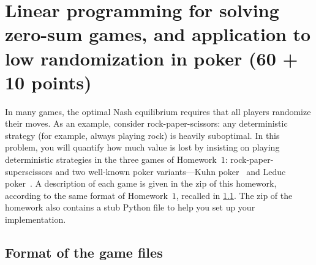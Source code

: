 \documentclass{homework}
\begin{document}
\section{Linear programming for solving zero-sum games, and application to low randomization in poker (60 + 10 points)}

In many games, the optimal Nash equilibrium requires that all players randomize their moves. As an example, consider rock-paper-scissors: any deterministic strategy (for example, always playing rock) is heavily suboptimal. In this problem, you will quantify how much value is lost by insisting on playing deterministic strategies in the three games of Homework~$1$: rock-paper-superscissors and two well-known poker variants---Kuhn poker~\citep{Kuhn50:Simplified} and Leduc poker~\citep{Southey05:Bayes}. A description of each game is given in the zip of this homework, according to the same format of Homework~$1$, recalled in \cref{sec:format}. The zip of the homework also contains a stub Python file to help you set up your implementation. 

\subsection{Format of the game files}\label{sec:format}
\end{document}
